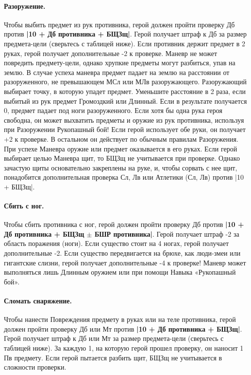 \paragraph{Разоружение.} Чтобы выбить предмет из рук противника, герой должен пройти проверку Дб против \textbf{|10 + Дб противника + БЩЗщ|}. Герой получает штраф к Дб за размер предмета-цели (сверьтесь с таблицей ниже). Если противник держит предмет в 2 руках, герой получает дополнительные -2 к проверке. Маневр не может повредить предмету-цели, однако хрупкие предметы могут разбиться, упав на землю. В случае успеха маневра предмет падает на землю на расстоянии от разоруженного, не превышающем МСл или МЛв разоружающего. Разоружающий выбирает точку, в которую упадет предмет. Уменьшите расстояние в 2 раза, если выбитый из рук предмет Громоздкий или Длинный. Если в результате получается 0, предмет падает под ноги разоруженного.
\newline
Если хотя бы одна рука героя свободна, он может выхватить предметы и оружие из рук противника, используя при Разоружении Рукопашный бой! Если герой использует обе руки, он получает +2 к проверке. В остальном он действует по обычным правилам Разоружения. При успехе Маневра оружие или предмет оказывается в его руках. Если герой выбирает целью Маневра щит, то БЩЗщ не учитывается при проверке. Однако зачастую щиты основательно закреплены на руке, и, чтобы сорвать с нее щит, понадобится дополнительная проверка Сл, Лв или Атлетики (Сл, Лв) против |10 +
БЩЗщ|.
\paragraph{Сбить с ног.} Чтобы сбить противника с ног, герой должен пройти проверку Дб против \textbf{|10 + Дб противника + БЩЗщ $\pm$ БШР противника|}.
\newline
Герой получает штраф -2 за область поражения (ноги). Если существо стоит на 4 ногах, герой получает дополнительные -2. Если существо передвигается на брюхе, как люди-змеи или гигантские слизни, герой получает дополнительные -4 к проверке! Маневр может выполняться лишь Длинным оружием или при помощи Навыка «Рукопашный бой».
\paragraph{Сломать снаряжение.} Чтобы нанести Повреждения предмету в руках или на теле противника, герой должен пройти проверку Дб или Мт против \textbf{|10 + Дб противника + БЩЗщ|}.
\newline
Герой получает штраф к Дб или Мт за размер предмета-цели (сверьтесь с таблицей ниже). За каждую 1, на которую герой прошел проверку, он наносит 1 Пв предмету. Если герой пытается разбить щит, БЩЗщ не учитывается в сложности проверки. 

